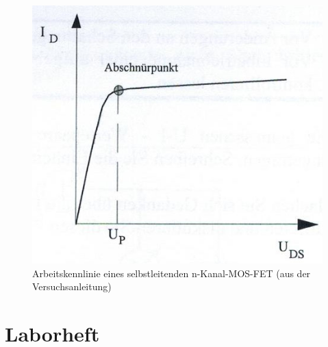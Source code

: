 \documentclass{scrartcl}
\begin{document}
\begin{figure}[H]
  \centering
    \includegraphics[scale=0.75]{Kennlinie_Drain.JPG}
  \caption{Arbeitskennlinie eines selbstleitenden n-Kanal-MOS-FET (aus der Versuchsanleitung)}
  \label{fig:Kennlinie_Drain}
\end{figure}

\section{Laborheft}
\end{document}
